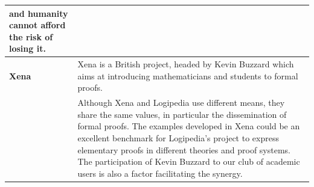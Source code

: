 \begin{longtable}{|p{}|p{}|}
and humanity cannot afford the risk of losing it.
\\
\hline
{\bf Xena} 
&
Xena is a British project, headed by Kevin Buzzard 
which aims at
introducing mathematicians and students
to formal proofs.\\
&
\hspace{0.4cm} Although Xena and Logipedia use different means, they
share the same values, in particular the dissemination of formal
proofs. The examples developed in Xena could be an excellent benchmark
for Logipedia's project to express elementary proofs in different theories
and proof systems. 
The participation of Kevin Buzzard to our club of academic users 
is also a factor facilitating the synergy.\\
\hline
\end{longtable}

